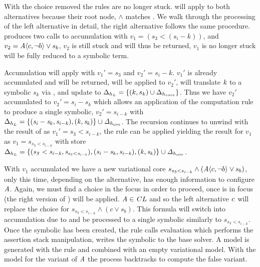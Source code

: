 With the choice removed the rules are no longer stuck.  will
apply to both alternatives because their root node, $\wedge$ matches
\boolFuncs{}. We walk through the processing of the left alternative in detail,
the right alternative follows the same procedure.  produces two
calls to accumulation with $v_{1} = (s_{3} < (s_{i} - k))$, and $v_{2} =
\chc[A]{c,\neg b} \vee s_{b}$, $v_{2}$ is still stuck and will thus be returned,
$v_{1}$ is no longer stuck will be fully reduced to a symbolic term.

Accumulation will apply  with $v_{1}' = s_{3}$ and $v_{2}' = s_{i}
- k$. $v_{1}'$ is already accumulated and will be returned, 
will be applied to $v_{2}'$, will translate $\mathit{k}$ to a symbolic $s_{k}$ via
, and update  to $\Delta_{h_{L}} = \{(k, s_{k})
\cup \Delta_{h_{core}}\}$. Thus we have $v_{2}'$ accumulated to $v_{2}' = s_{i}
- s_{k}$ which allows an application of the computation rule 
to produce a single symbolic, $v_{2}' = s_{i-k}$ with $\Delta_{h_{L}} =
\mathit{\{(s_{i} - s_{k}, s_{i-k}), (k,s_{k})\} \cup \Delta_{h_{core}}}$. The
recursion continues to unwind with the result of  as $v_{1}' =
s_{3} < s_{i-k}$, the rule  can be applied yielding the result
for $v_{1}$ as $v_{1} = s_{s_{3}<s_{i-k}}$ with store $\Delta_{h_{L}} =
\mathit{\{(s_{3} < s_{i-k}, s_{s_{3}<s_{i-k}}), (s_{i} - s_{k}, s_{i-k}),
  (k,s_{k})\} \cup \Delta_{h_{core}}}$.

With $v_{1}$ accumulated we have a new variational core $s_{s_{3}<s_{i-k}} \wedge
(\chc[A]{c, \neg b} \vee s_{b})$, only this time, depending on the alternative,
\configuration{} has enough information to configure $\mathit{A}$. Again, we must
find a choice in the focus in order to proceed, once  is in
focus  (the right version of ) will be applied.
$\mathit{A} \in \mathit{C}{L}$ and so the left alternative $\mathit{c}$ will replace
the choice for $s_{s_{3}<s_{i-k}} \wedge (c \vee s_{b})$. This formula will
switch into accumulation due to  and be processed to a single
symbolic similarly to $s_{s_{3}<s_{i-k}}$. Once the symbolic has been created,
the  rule calls evaluation which performs the assertion stack
manipulation, writes the symbolic to the base solver. A model is generated with
the  rule and combined with an empty variational model. With the
model for the \true{} variant of $\mathit{A}$ the process backtracks to compute the
false variant.

